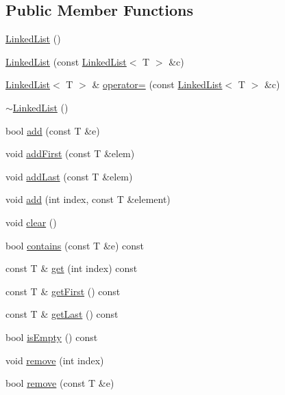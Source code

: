 \subsection*{Public Member Functions}
\begin{DoxyCompactItemize}
\item 
\hyperlink{class_linked_list_a3c20fcfec867e867f541061a09fc640c}{Linked\-List} ()
\item 
\hyperlink{class_linked_list_a06c97ccd01573325f1bddf30e15e366c}{Linked\-List} (const \hyperlink{class_linked_list}{Linked\-List}$<$ T $>$ \&c)
\item 
\hyperlink{class_linked_list}{Linked\-List}$<$ T $>$ \& \hyperlink{class_linked_list_a07ef021b97550ab6ed0f3a1d1ad7427d}{operator=} (const \hyperlink{class_linked_list}{Linked\-List}$<$ T $>$ \&c)
\item 
\hyperlink{class_linked_list_a7c37609df3b83bc4eb0281b852f93fd7}{$\sim$\-Linked\-List} ()
\item 
bool \hyperlink{class_linked_list_a92f5681edf9854f140a581d9c771ac05}{add} (const T \&e)
\item 
void \hyperlink{class_linked_list_af19a202520edaf4d33edff6f55daf996}{add\-First} (const T \&elem)
\item 
void \hyperlink{class_linked_list_ac74f2eff664c772462ec59e1d466a7a5}{add\-Last} (const T \&elem)
\item 
void \hyperlink{class_linked_list_a802cbf222822db07d5f5af94b8a518be}{add} (int index, const T \&element)
\item 
void \hyperlink{class_linked_list_a50c26292740c964ac7bef0e072868be1}{clear} ()
\item 
bool \hyperlink{class_linked_list_ad5a277abf94b311cc88e1c0c0dd6ce8d}{contains} (const T \&e) const 
\item 
const T \& \hyperlink{class_linked_list_a78c5a8787f9470caf6338926ada07799}{get} (int index) const 
\item 
const T \& \hyperlink{class_linked_list_af44b74adc8430722a39e3b6cc98bc6d1}{get\-First} () const 
\item 
const T \& \hyperlink{class_linked_list_a0db2a1d97087a713049ea00e94e613e1}{get\-Last} () const 
\item 
bool \hyperlink{class_linked_list_a1b28b1e19e5aa68f3d89352e307928f6}{is\-Empty} () const 
\item 
void \hyperlink{class_linked_list_a8a6f5190222bd179daeb7cc548d36a29}{remove} (int index)
\item 
bool \hyperlink{class_linked_list_a7fb1e163adf0abe2fd6253fcd42b90db}{remove} (const T \&e)

\end{DoxyCompactItemize}
